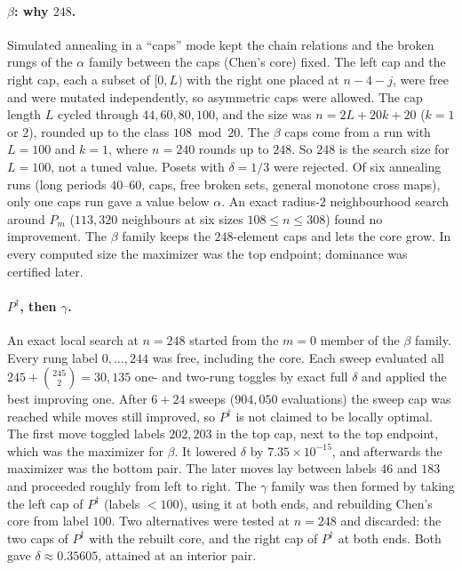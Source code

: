 \documentclass[11pt]{amsart}
\theoremstyle{definition}
\theoremstyle{remark}
\begin{document}
\paragraph{$\beta$: why $248$.} Simulated annealing in a ``caps'' mode kept the chain relations and the broken rungs of the $\alpha$ family between the caps (Chen's core) fixed. The left cap and the right cap, each a subset of $[0,L)$ with the right one placed at $n-4-j$, were free and were mutated independently, so asymmetric caps were allowed. The cap length $L$ cycled through $44,60,80,100$, and the size was $n=2L+20k+20$ ($k=1$ or $2$), rounded up to the class $108\bmod20$. The $\beta$ caps come from a run with $L=100$ and $k=1$, where $n=240$ rounds up to $248$. So $248$ is the search size for $L=100$, not a tuned value. Posets with $\delta=1/3$ were rejected. Of six annealing runs (long periods $40$--$60$, caps, free broken sets, general monotone cross maps), only one caps run gave a value below $\alpha$. An exact radius-$2$ neighbourhood search around $P_m$ ($113{,}320$ neighbours at six sizes $108\le n\le308$) found no improvement. The $\beta$ family keeps the $248$-element caps and lets the core grow. In every computed size the maximizer was the top endpoint; dominance was certified later.

\paragraph{$P^\dagger$, then $\gamma$.} An exact local search at $n=248$ started from the $m=0$ member of the $\beta$ family. Every rung label $0,\dots,244$ was free, including the core. Each sweep evaluated all $245+\binom{245}{2}=30{,}135$ one- and two-rung toggles by exact full $\delta$ and applied the best improving one. After $6+24$ sweeps ($904{,}050$ evaluations) the sweep cap was reached while moves still improved, so $P^\dagger$ is not claimed to be locally optimal. The first move toggled labels $202,203$ in the top cap, next to the top endpoint, which was the maximizer for $\beta$. It lowered $\delta$ by $7.35\times10^{-15}$, and afterwards the maximizer was the bottom pair. The later moves lay between labels $46$ and $183$ and proceeded roughly from left to right. The $\gamma$ family was then formed by taking the left cap of $P^\dagger$ (labels $<100$), using it at both ends, and rebuilding Chen's core from label $100$. Two alternatives were tested at $n=248$ and discarded: the two caps of $P^\dagger$ with the rebuilt core, and the right cap of $P^\dagger$ at both ends. Both gave $\delta\approx0.35605$, attained at an interior pair.
\end{document}
